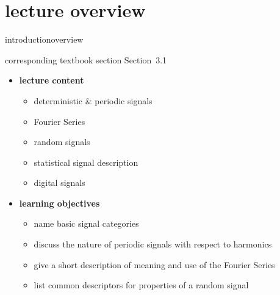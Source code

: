 


\subtitle{Module 3.1: Input Representation~---~Signals}


	

    \section[overview]{lecture overview}
        \begin{frame}{introduction}{overview}
            \begin{block}{corresponding textbook section}
                Section~3.1
            \end{block}

            \begin{itemize}
                \item   \textbf{lecture content}
                    \begin{itemize}
                        \item   deterministic \& periodic signals
                        \item   Fourier Series
                        \item   random signals
                        \item   statistical signal description
                        \item   digital signals
                    \end{itemize}
                \bigskip
                \item<2->   \textbf{learning objectives}
                    \begin{itemize}
                        \item   name basic signal categories
                        \item   discuss the nature of periodic signals with respect to harmonics
                        \item   give a short description of meaning and use of the Fourier Series
                        \item   list common descriptors for properties of a random signal
                    \end{itemize}
            \end{itemize}
        \end{frame}
        
